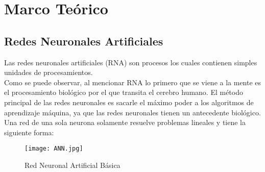 \section{Marco Teórico}

    \subsection{Redes Neuronales Artificiales}
    	
    	
        Las redes neuronales artificiales (RNA) son procesos los cuales contienen simples
        unidades de procesamientos. \\
        
        Como se puede observar, al mencionar RNA lo primero que se viene a la mente es el 
        procesamiento biol\'ogico por el que transita el cerebro humano. El m\'etodo principal 
        de las redes neuronales es sacarle el máximo poder a los algoritmos de aprendizaje 
        m\'aquina, ya que las redes neuronales tienen un antecedente biol\'ogico.\\

        Una red de una sola neurona solamente resuelve problemas lineales y tiene la 
        siguiente forma:
        \begin{figure}[H]
            \centering
            \texttt{[image: ANN.jpg]}
            \caption{Red Neuronal Artificial B\'asica}
            \label{fig:fig1}
        \end{figure}

